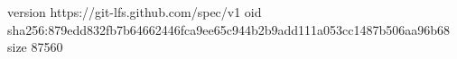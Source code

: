 version https://git-lfs.github.com/spec/v1
oid sha256:879edd832fb7b64662446fca9ee65c944b2b9add111a053cc1487b506aa96b68
size 87560
